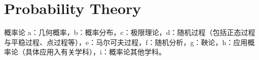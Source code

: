 

\chapter{ Probability Theory}

概率论
a：几何概率，b：概率分布，c：极限理论，d：随机过程（包括正态过程与平稳过程、点过程等），e：马尔可夫过程，f：随机分析，g：鞅论，h：应用概率论（具体应用入有关学科），i：概率论其他学科。

